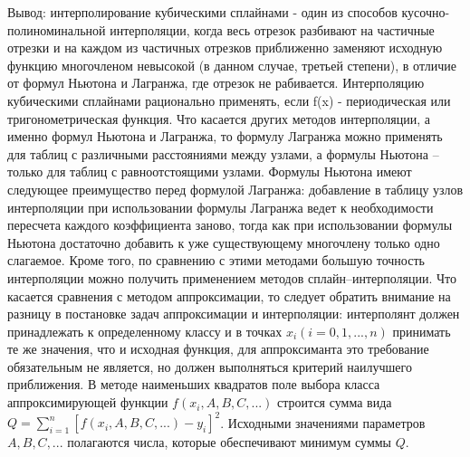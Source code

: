 \newpage
   
Вывод: интерполирование кубическими сплайнами - один из способов кусочно-полиноминальной интерполяции, когда весь отрезок разбивают на частичные отрезки и на каждом из частичных отрезков приближенно заменяют исходную функцию многочленом невысокой (в данном случае, третьей степени), в отличие от формул Ньютона и Лагранжа, где отрезок не рабивается. Интерполяцию кубическими сплайнами рационально применять, если f(x) - периодическая или тригонометрическая функция. Что касается других методов интерполяции, а именно формул Ньютона и Лагранжа, то формулу Лагранжа можно применять для таблиц с различными расстояниями между узлами, а формулы Ньютона – только для таблиц с равноотстоящими узлами. Формулы Ньютона имеют следующее преимущество перед формулой Лагранжа: добавление в таблицу узлов интерполяции при использовании формулы Лагранжа ведет к необходимости пересчета каждого коэффициента заново, тогда как при использовании формулы Ньютона достаточно добавить к уже существующему многочлену только одно слагаемое.
Кроме того, по сравнению с этими методами большую точность интерполяции можно получить применением методов сплайн–интерполяции. Что касается сравнения с методом аппроксимации, то следует обратить внимание на разницу в постановке задач аппроксимации и интерполяции: интерполянт должен принадлежать к определенному классу и в точках $x_i (i = 0, 1, ..., n)$ принимать те же значения, что и исходная функция, для аппроксиманта это требование обязательным не является, но должен выполняться критерий наилучшего приближения. В методе наименьших квадратов поле выбора класса аппроксимирующей функции $f(x_i, A, B, C, ...)$ строится сумма вида $Q = \sum\limits_{i=1}^n [f(x_i, A, B, C, ...) - y_i]^2$. Исходными значениями параметров $A, B, C, ...$ полагаются числа,
которые обеспечивают минимум суммы $Q$.